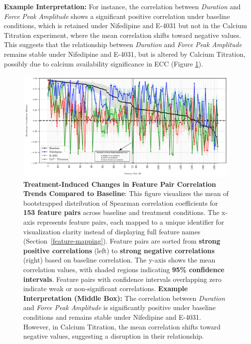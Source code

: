 \documentclass{report}
\begin{document}
    
    \textbf{Example Interpretation:} For instance, the correlation between \textit{Duration} and \textit{Force Peak Amplitude} shows a significant positive correlation under baseline conditions, which is retained under Nifedipine and E-4031 but not in the Calcium Titration experiment, where the mean correlation shifts toward negative values. This suggests that the relationship between \textit{Duration} and \textit{Force Peak Amplitude} remains stable under Nifedipine and E-4031, but is altered by Calcium Titration, possibly due to calcium availability significance in ECC (Figure \ref{fig:line_plot_correlation_trend}).
    \begin{figure}[H]
        \centering
        \includegraphics[width=1\textwidth, keepaspectratio, height=1.0\textheight]{plots/chapter_7/drug_correlations_comparison_numbered_annotated.pdf}
        \caption[Treatment-Induced Changes in Feature Pair Correlation Trends Compared to Baseline]{\textbf{Treatment-Induced Changes in Feature Pair Correlation Trends Compared to Baseline}:
            This figure visualizes the mean of bootstrapped distribution of Spearman correlation coefficients for \textbf{153 feature pairs} across baseline and treatment conditions. The x-axis represents feature pairs, each mapped to a unique identifier for visualization clarity instead of displaying full feature names (Section~\ref{feature-mapping}). Feature pairs are sorted from \textbf{strong positive correlations} (left) to \textbf{strong negative correlations} (right) based on baseline correlation. The y-axis shows the mean correlation values, with shaded regions indicating \textbf{95\% confidence intervals}. Feature pairs with confidence intervals overlapping zero indicate weak or non-significant correlations. \textbf{Example Interpretation (Middle Box):} The correlation between \textit{Duration} and \textit{Force Peak Amplitude} is significantly positive under baseline conditions and remains stable under Nifedipine and E-4031. However, in Calcium Titration, the mean correlation shifts toward negative values, suggesting a disruption in their relationship.}
        
        \label{fig:line_plot_correlation_trend}
    \end{figure}
\end{document}
